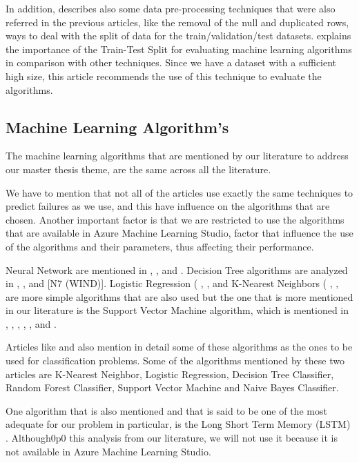In addition, \cite{MED_1} describes also some data pre-processing techniques that were also referred in the previous articles, like the removal of the null and duplicated rows, ways to deal with the split of data for the train/validation/test datasets.
\cite{Machine_Learning_Mistery_Train-Test-Split} explains the importance of the Train-Test Split for evaluating machine learning algorithms in comparison with other techniques. Since we have a dataset with a sufficient high size, this article recommends the use of this technique to evaluate the algorithms.


\subsection{Machine Learning Algorithm's}

The machine learning algorithms that are mentioned by our literature to address our master thesis theme, are the same across all the literature.

We have to mention that not all of the articles use exactly the same techniques to predict failures as we use, and this have influence on the algorithms that are chosen. Another important factor is that we are restricted to use the algorithms that are available in Azure Machine Learning Studio, factor that influence the use of the algorithms and their parameters, thus affecting their performance.

Neural Network are mentioned in \cite{OLD_15_WIND}, \cite{OLD_20_WIND}, \cite{OLD_41_WIND} and \cite{N_8_WIND}. Decision Tree algorithms are analyzed in \cite{OLD_41_WIND}, \cite{39_WIND}, \cite{N_3_WIND} and [N7 (WIND)]. Logistic Regression ( \cite{N_5_WIND}, \cite{N_7_GENERAL}, \cite{N_8_WIND} and K-Nearest Neighbors ( \cite{39_WIND}, \cite{N_3_WIND}, \cite{N_4_WIND} are more simple algorithms that are also used but the one that is more mentioned in our literature is the Support Vector Machine algorithm, which is mentioned in \cite{OLD_41_WIND}, \cite{OLD_19_WIND}, \cite{39_WIND}, \cite{N_1_WIND}, \cite{N_2_WIND}, \cite{N_3_WIND} and \cite{N_8_WIND}.

Articles like \cite{ML_Alg_Analysis_2} and \cite{ML_Alg_Analysis} also mention in detail some of these algorithms as the ones to be used for classification problems. Some of the algorithms mentioned by these two articles are K-Nearest Neighbor, Logistic Regression, Decision Tree Classifier, Random Forest Classifier, Support Vector Machine and Naive Bayes Classifier.

One algorithm that is also mentioned and that is said to be one of the most adequate for our problem in particular, is the Long Short Term Memory (LSTM) \cite{TDC_1}. Although0p0 this analysis from our literature, we will not use it because it is not available in Azure Machine Learning Studio.


